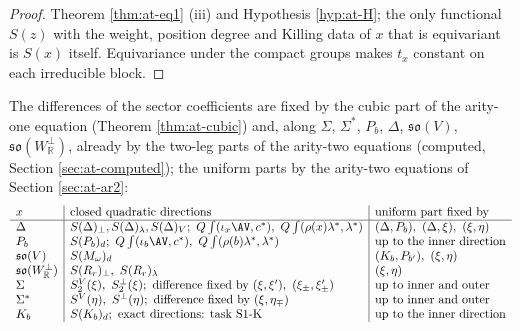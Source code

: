 \begin{proof}
Theorem \ref{thm:at-eq1} (iii) and Hypothesis \ref{hyp:at-H}; the only functional $S(z)$ with the weight, position degree and Killing data of $x$ that is equivariant is $S(x)$ itself. Equivariance under the compact groups makes $t_x$ constant on each irreducible block.
\end{proof}

\begin{remark}
\label{rem:at-freetable}
The differences of the sector coefficients are fixed by the cubic part of the arity-one equation (Theorem \ref{thm:at-cubic}) and, along $\Sigma$, $\Sigma^*$, $P_b$, $\Delta$, $\mathfrak{so}(V)$, $\mathfrak{so}(W^\perp_{\mathbb R})$, already by the two-leg parts of the arity-two equations (computed, Section \ref{sec:at-computed}); the uniform parts by the arity-two equations of Section \ref{sec:at-ar2}:
\[
\begin{array}{l|l|l}
x & \text{closed quadratic directions} & \text{uniform part fixed by}\\
\hline
\Delta & S(\Delta)_\perp,S(\Delta)_\lambda,S(\Delta)_V;\ Q\int(\iota_x\AV,c^*),\ Q\int(\rho(x)\lambda^*,\lambda^*) & (\Delta,P_b),\ (\Delta,\xi),\ (\xi,\eta)\\
P_b & S(P_b)_d;\ Q\int(\iota_b\AV,c^*),\ Q\int(\rho(b)\lambda^*,\lambda^*) & \text{up to the inner direction}\\
\mathfrak{so}(V) & S(M_\omega)_d & (K_b,P_{b'}),\ (\xi,\eta)\\
\mathfrak{so}(W^\perp_{\mathbb R}) & S(R_r)_\perp,\ S(R_r)_\lambda & (\xi,\eta)\\
\Sigma & S^V_2(\xi),\ S^\perp_2(\xi);\ \text{difference fixed by }(\xi,\xi'),\ (\xi_\pm,\xi'_\pm) & \text{up to inner and outer}\\
\Sigma^* & S^V(\eta),\ S^\perp(\eta);\ \text{difference fixed by }(\xi,\eta_\mp) & \text{up to inner and outer}\\
K_b & S(K_b)_d;\ \text{exact directions: task S1-K} & \text{up to the inner direction}
\end{array}
\]
\end{remark}
